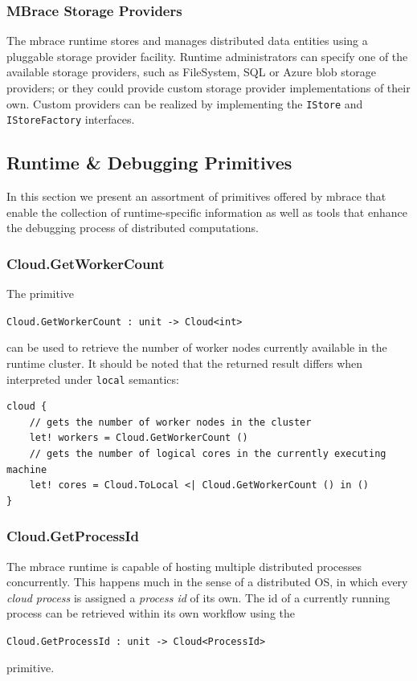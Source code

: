\documentclass[9pt,a4paper]{article}
\newcommand{\mbrace}{mbrace}
\newcommand{\TitularMbrace}{MBrace}
\newcommand{\centertt}[1]{\begin{center}\texttt{#1}\end{center}}
\begin{document}
\subsubsection*{\TitularMbrace{} Storage Providers}

The \mbrace{} runtime stores and manages distributed data entities using a
pluggable storage provider facility. Runtime administrators can specify one
of the available storage providers, such as FileSystem, SQL or Azure blob storage
providers; or they could provide custom storage provider implementations of their own.
Custom providers can be realized by implementing the \texttt{IStore} and
\texttt{IStoreFactory} interfaces.

\subsection{Runtime \& Debugging Primitives}

In this section we present an assortment of primitives offered by \mbrace{}
that enable the collection of runtime-specific information as well as tools
that enhance the debugging process of distributed computations.

\subsubsection*{Cloud.GetWorkerCount}

The primitive
\centertt{Cloud.GetWorkerCount : unit -> Cloud<int>} 
can be used to retrieve the number of worker nodes currently available in the 
runtime cluster. It should be noted that the returned result differs when
interpreted under \texttt{local} semantics:
\begin{lstlisting}
cloud {
    // gets the number of worker nodes in the cluster
    let! workers = Cloud.GetWorkerCount ()
    // gets the number of logical cores in the currently executing machine
    let! cores = Cloud.ToLocal <| Cloud.GetWorkerCount () in ()
}
\end{lstlisting}

\subsubsection*{Cloud.GetProcessId}

The \mbrace{} runtime is capable of hosting multiple distributed processes concurrently.
This happens much in the sense of a distributed OS, in which every \emph{cloud process}
is assigned a \emph{process id} of its own. The id of a currently running process can
be retrieved within its own workflow using the
\centertt{Cloud.GetProcessId : unit -> Cloud<ProcessId>}
primitive.
\end{document}
